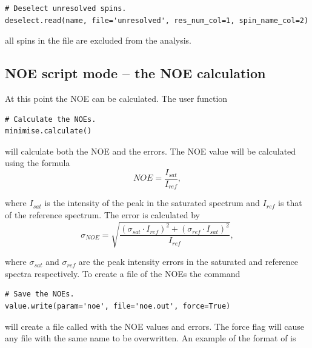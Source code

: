 \begin{lstlisting}[firstnumber=30]
# Deselect unresolved spins.
deselect.read(name, file='unresolved', res_num_col=1, spin_name_col=2)
\end{lstlisting}

all spins in the file  are excluded from the analysis.




\subsection{NOE script mode -- the NOE calculation}

At this point the NOE can be calculated.
The user function

\begin{lstlisting}[firstnumber=33]
# Calculate the NOEs.
minimise.calculate()
\end{lstlisting}

will calculate both the NOE and the errors.
The NOE value will be calculated using the formula
\begin{equation}
NOE = \frac{I_{sat}}{I_{ref}},
\end{equation}

\noindent where $I_{sat}$ is the intensity of the peak in the saturated spectrum and $I_{ref}$ is that of the reference spectrum.
The error is calculated by
\begin{equation}
\sigma_{NOE} = \sqrt{\frac{(\sigma_{sat} \cdot I_{ref})^2 + (\sigma_{ref} \cdot I_{sat})^2}{I_{ref}}},
\end{equation}

\noindent where $\sigma_{sat}$ and $\sigma_{ref}$ are the peak intensity errors in the saturated and reference spectra respectively.
To create a file of the NOEs the command

\begin{lstlisting}[firstnumber=36]
# Save the NOEs.
value.write(param='noe', file='noe.out', force=True)
\end{lstlisting}

will create a file called  with the NOE values and errors.
The force flag will cause any file with the same name to be overwritten.
An example of the format of  is

